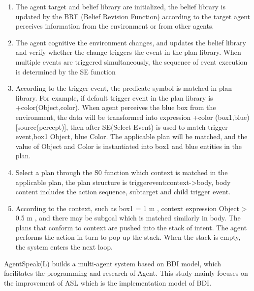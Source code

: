 \documentclass{article}
\begin{document}
\begin{enumerate}[1.]
    \item The agent target and belief library are initialized, the belief
library is updated by the BRF (Belief Revision Function)
according to the target agent perceives information from the
environment or from other agents.
    \item The agent cognitive the environment changes, and updates
the belief library and verify whether the change triggers the
event in the plan library. When multiple events are triggered
simultaneously, the sequence of event execution is
determined by the SE function
    \item According to the trigger event, the predicate symbol is
matched in plan library. For example, if default trigger
event in the plan library is +color(Object,color). When
agent perceives the blue box from the environment, the data
will be transformed into expression +color
(box1,blue)[source(percept)], then after SE(Select Event)
is used to match trigger event,box1 Object, blue
Color. The applicable plan will be matched, and the value of Object and Color is instantiated into box1 and blue entities
in the plan.
    \item Select a plan through the S0 function which context is
matched in the applicable plan, the plan structure is
triggerevent:context->body, body content includes the
action sequence, subtarget and child trigger event.
    \item According to the context, such as box1 = 1 m , context
expression Object > 0.5 m , and there may be subgoal which
is matched similarly in body. The plans that conform to
context are pushed into the stack of intent. The agent
performs the action in turn to pop up the stack. When the
stack is empty, the system enters the next loop.
\end{enumerate}
AgentSpeak(L) builds a multi-agent system based on BDI
model, which facilitates the programming and research of Agent.
This study mainly focuses on the improvement of ASL which is
the implementation model of BDI.
\end{document}

